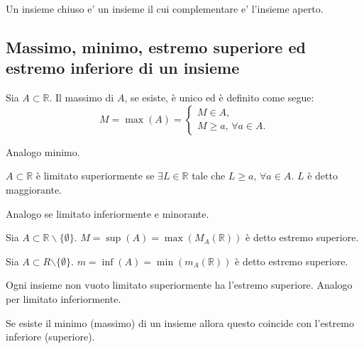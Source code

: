 \begin{definition}
    Un insieme chiuso e' un insieme il cui complementare e' l'insieme aperto.
\end{definition}

\subsection{Massimo, minimo, estremo superiore ed estremo inferiore di un insieme}
\begin{definition}[Massimo]
    Sia $A\subset\mathbb R$. Il massimo di $A$, se esiste, è unico ed è definito come segue:
    \begin{equation*}
        M=\max(A)=
        \begin{cases}
            M\in A,\\
            M\geq a,\, \forall a\in A.
        \end{cases}
    \end{equation*}
\end{definition}

Analogo minimo.

\begin{definition}
    $A\subset\mathbb R$ è limitato superiormente se $\exists L\in\mathbb R$ tale che $L\geq a,\,\forall a\in A$.
    $L$ è detto maggiorante.
\end{definition}

Analogo se limitato inferiormente e minorante.

\begin{definition}
    Sia $A\subset\mathbb R\backslash\{\emptyset\}$. $M=\sup(A)=\max(M_A(\mathbb{R}))$ è detto estremo superiore.
\end{definition}

\begin{definition}
    Sia $A\subset R\mathbb\backslash\{\emptyset\}$. $m=\inf(A)=\min(m_A(\mathbb{R}))$ è detto estremo superiore.
\end{definition}

\begin{theorem}
    Ogni insieme non vuoto limitato superiormente ha l'estremo superiore. Analogo per limitato inferiormente.
\end{theorem}

\begin{theorem}
    Se esiste il minimo (massimo) di un insieme allora questo coincide con l'estremo inferiore (superiore).
\end{theorem}